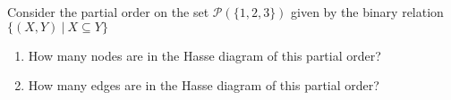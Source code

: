 
Consider the partial order on the set $\mathcal{P}(\{1,2,3\})$ given by the binary relation 
$\{ (X,Y) ~|~X \subseteq Y \}$
\begin{enumerate}
\item How many nodes are in the Hasse diagram of this partial order?
\item How many edges are in the Hasse diagram of this partial order?
\end{enumerate}